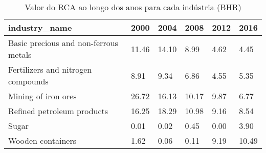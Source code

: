 \begin{table}
\centering
\caption{Valor do RCA ao longo dos anos para cada indústria (BHR)}
\begin{tabular}{p{6cm}p{1.5cm}p{1.5cm}p{1.5cm}p{1.5cm}p{1.5cm}}
\toprule
                        industry\_name &  2000 &  2004 &  2008 & 2012 &  2016 \\
\midrule
Basic precious and non-ferrous metals & 11.46 & 14.10 &  8.99 & 4.62 &  4.45 \\
   Fertilizers and nitrogen compounds &  8.91 &  9.34 &  6.86 & 4.55 &  5.35 \\
                  Mining of iron ores & 26.72 & 16.13 & 10.17 & 9.87 &  6.77 \\
           Refined petroleum products & 16.25 & 18.29 & 10.98 & 9.16 &  8.54 \\
                                Sugar &  0.01 &  0.02 &  0.45 & 0.00 &  3.90 \\
                    Wooden containers &  1.62 &  0.06 &  0.11 & 9.19 & 10.49 \\
\bottomrule
\end{tabular}
\end{table}
